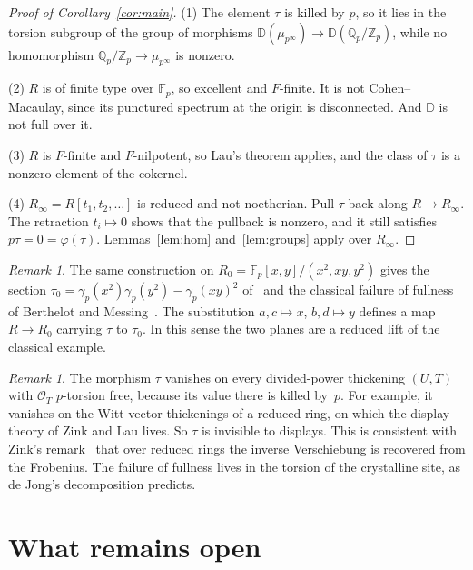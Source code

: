\documentclass[11pt]{amsart}
\theoremstyle{remark}
\newtheorem{remark}[theorem]{Remark}
\newcommand{\Fp}{\mathbb{F}_p}
\newcommand{\Zp}{\mathbb{Z}_p}
\newcommand{\Qp}{\mathbb{Q}_p}
\newcommand{\D}{\mathbb{D}}
\newcommand{\mup}{\mu_{p^\infty}}
\newcommand{\QZ}{\Qp/\Zp}
\begin{document}
\begin{proof}[Proof of Corollary~\ref{cor:main}]
(1) The element $\tau$ is killed by $p$, so it lies in the torsion subgroup of the group of morphisms $\D(\mup)\to\D(\QZ)$, while no homomorphism $\QZ\to\mup$ is nonzero.

(2) $R$ is of finite type over $\Fp$, so excellent and $F$-finite. It is not Cohen--Macaulay, since its punctured
spectrum at the origin is disconnected. And $\D$ is not full over it.

(3) $R$ is $F$-finite and $F$-nilpotent, so Lau's theorem applies, and the class of $\tau$ is a nonzero element of the
cokernel.

(4) $R_\infty=R[t_1,t_2,\dots]$ is reduced and not noetherian. Pull $\tau$ back along $R\to R_\infty$. The
retraction $t_i\mapsto0$ shows that the pullback is nonzero, and it still satisfies $p\tau=0=\varphi(\tau)$.
Lemmas~\ref{lem:hom} and~\ref{lem:groups} apply over $R_\infty$.
\end{proof}

\begin{remark}\label{rem:R0}
The same construction on $R_0=\Fp[x,y]/(x^2,xy,y^2)$ gives the section
$\tau_0=\gamma_p(x^2)\gamma_p(y^2)-\gamma_p(xy)^2$ of~\cite[Example~07LJ]{Stacks} and the classical failure of fullness
of Berthelot and Messing~\cite[4.4.1]{BM}. The substitution $a,c\mapsto x$, $b,d\mapsto y$ defines a map $R\to R_0$
carrying $\tau$ to $\tau_0$. In this sense the two planes are a reduced lift of the classical example.
\end{remark}

\begin{remark}\label{rem:witt}
The morphism $\tau$ vanishes on every divided-power thickening $(U,T)$ with $\mathcal O_T$ $p$-torsion free, because its
value there is killed by~$p$. For example, it vanishes on the Witt vector thickenings of a reduced ring, on which the
display theory of Zink and Lau lives. So $\tau$ is invisible to displays. This is consistent with Zink's
remark~\cite[p.~2]{Zink} that over reduced rings the inverse Verschiebung is recovered from the Frobenius. The failure
of fullness lives in the torsion of the crystalline site, as de Jong's decomposition predicts.
\end{remark}

\section{What remains open}\label{sec:open}
\end{document}
